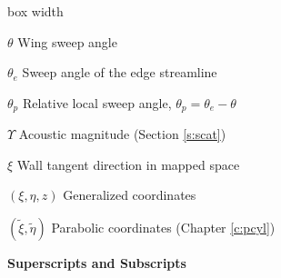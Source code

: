 \begin{descriptionlist}{box width}
\item[$\theta$]		Wing sweep angle

\item[$\theta_e$]	Sweep angle of the edge streamline

\item[$\theta_p$]	Relative local sweep angle, 
                        $\theta_p = \theta_e - \theta$

\item[$\Upsilon$]	Acoustic magnitude (Section \ref{s:scat})

\item[$\xi$]		Wall tangent direction in mapped space

\item[$(\xi,\eta,z)$]   Generalized coordinates

\item[$(\tilde\xi,\tilde\eta)$]   Parabolic coordinates (Chapter \ref{c:pcyl})

\end{descriptionlist}

\bigskip
\centerline{\Large\bf Superscripts and Subscripts}


